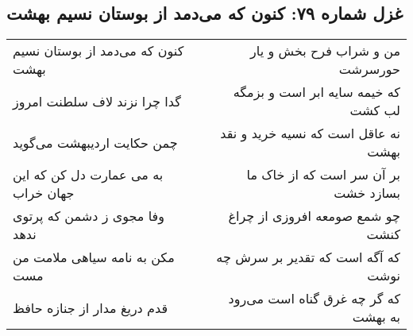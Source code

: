 \begin{center}
\section*{غزل شماره ۷۹: کنون که می‌دمد از بوستان نسیم بهشت}
\label{sec:sh079}
\begin{longtable}{l p{0.5cm} r}
کنون که می‌دمد از بوستان نسیم بهشت
&&
من و شراب فرح بخش و یار حورسرشت
\\
گدا چرا نزند لاف سلطنت امروز
&&
که خیمه سایه ابر است و بزمگه لب کشت
\\
چمن حکایت اردیبهشت می‌گوید
&&
نه عاقل است که نسیه خرید و نقد بهشت
\\
به می عمارت دل کن که این جهان خراب
&&
بر آن سر است که از خاک ما بسازد خشت
\\
وفا مجوی ز دشمن که پرتوی ندهد
&&
چو شمع صومعه افروزی از چراغ کنشت
\\
مکن به نامه سیاهی ملامت من مست
&&
که آگه است که تقدیر بر سرش چه نوشت
\\
قدم دریغ مدار از جنازه حافظ
&&
که گر چه غرق گناه است می‌رود به بهشت
\\
\end{longtable}
\end{center}
